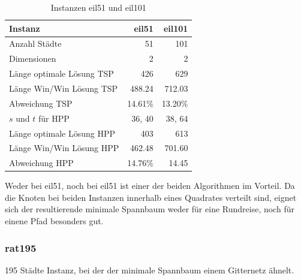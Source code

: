 \documentclass[11pt,a4paper]{article}
\begin{document}
\begin{table}[H]
        \centering
        \begin{tabular}{| l | r | r |}
            \hline
                Instanz                     & \textbf{eil51}
                                            & \textbf{eil101} \\ \hline
                Anzahl Städte               & 51        & 101       \\ \hline
                Dimensionen                 & 2         & 2         \\ \hline
                Länge optimale Lösung TSP   & 426       & 629       \\ \hline
                Länge Win/Win Lösung  TSP   & 488.24    & 712.03    \\ \hline
                Abweichung TSP              & 14.61\%   & 13.20\%   \\ \hline
                $s$ und $t$ für HPP         & 36, 40    & 38, 64    \\ \hline
                Länge optimale Lösung HPP   & 403       & 613       \\ \hline
                Länge Win/Win Lösung  HPP   & 462.48    & 701.60    \\ \hline
                Abweichung HPP              & 14.76\%   & 14.45     \\ \hline
        \end{tabular}
        \caption{Instanzen eil51 und eil101}
        \label{tab:instanzen_eil}
\end{table}

Weder bei eil51, noch bei eil51 ist einer der beiden Algorithmen im Vorteil. Da die Knoten bei beiden Instanzen innerhalb eines Quadrates verteilt sind, eignet sich der resultierende minimale Spannbaum weder für eine Rundreise, noch für einene Pfad besonders gut.

\newpage

\subsubsection{rat195}
195 Städte Instanz, bei der der minimale Spannbaum einem Gitternetz ähnelt.
\end{document}
